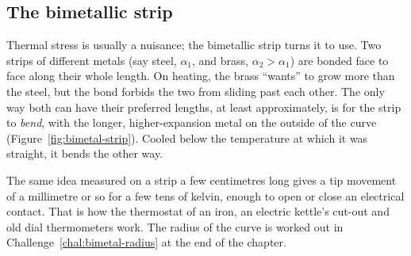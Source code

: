 
\subsection{The bimetallic strip}

Thermal stress is usually a nuisance; the bimetallic strip turns it to use. Two strips of different
metals (say steel, $\alpha_1$, and brass, $\alpha_2>\alpha_1$) are bonded face to face along their
whole length. On heating, the brass ``wants'' to grow more than the steel, but the bond forbids the two
from sliding past each other. The only way both can have their preferred lengths, at least
approximately, is for the strip to \emph{bend}, with the longer, higher-expansion metal on the outside
of the curve (Figure~\ref{fig:bimetal-strip}). Cooled below the temperature at which it was straight,
it bends the other way.

\begin{figure}[htbp]
\centering
{}
\end{figure}

The same idea measured on a strip a few centimetres long gives a tip movement of a millimetre or so for
a few tens of kelvin, enough to open or close an electrical contact. That is how the thermostat of an
iron, an electric kettle's cut-out and old dial thermometers work. The radius of the curve is worked
out in Challenge~\ref{chal:bimetal-radius} at the end of the chapter.

